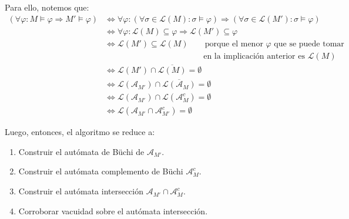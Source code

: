 \documentclass{article}
\begin{document}
Para ello, notemos que:
\begin{equation*}
	\begin{aligned}
		(\forall \varphi : M \vDash \varphi \Rightarrow M' \vDash \varphi) & \iff \forall \varphi : (\forall \sigma \in \mathcal{L}(M) : \sigma \vDash \varphi) \Rightarrow (\forall \sigma \in \mathcal{L}(M') : \sigma \vDash \varphi) \\
		                                                                   & \iff \forall \varphi : \mathcal{L}(M) \subseteq \varphi \Rightarrow \mathcal{L}(M') \subseteq \varphi                                                       \\
		                                                                   & \iff \mathcal{L}(M') \subseteq \mathcal{L}(M) \qquad \text{porque el menor } \varphi \text{ que se puede tomar }                                            \\
		                                                                   & \qquad\qquad\qquad\qquad\qquad\qquad \text{en la implicación anterior es } \mathcal{L}(M)                                                                   \\
		                                                                   & \iff \mathcal{L}(M') \cap \overline{\mathcal{L}(M)} = \emptyset                                                                                             \\
		                                                                   & \iff \mathcal{L}(\mathcal{A}_{M'}) \cap \overline{\mathcal{L}(\mathcal{A}_M)} = \emptyset                                                                   \\
		                                                                   & \iff \mathcal{L}(\mathcal{A}_{M'}) \cap \mathcal{L}(\mathcal{A}_M^c) = \emptyset                                                                            \\
		                                                                   & \iff \mathcal{L}(\mathcal{A}_{M'} \cap \mathcal{A}_{M'}^c) = \emptyset
	\end{aligned}
\end{equation*}

Luego, entonces, el algoritmo se reduce a:
\begin{enumerate}
	\item Construir el autómata de Büchi de $\mathcal{A}_{M'}$.
	\item Construir el autómata complemento de Büchi $\mathcal{A}^c_{M}$.
	\item Construir el autómata intersección $\mathcal{A}_{M'} \cap \mathcal{A}_M^c$.
	\item Corroborar vacuidad sobre el autómata intersección.
\end{enumerate}
\end{document}
